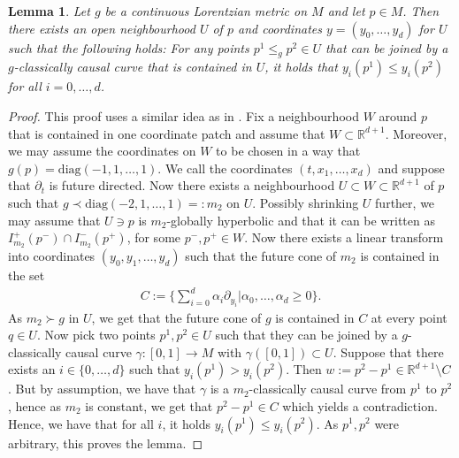 \documentclass[a4paper,10pt]{article}
\newtheorem{lemma}[theorem]{Lemma}
\numberwithin{equation}{section}
\newcommand{\R}{\mathbb{R}}
\newcommand{\diag}{\mathrm{diag}}
\begin{document}
\begin{lemma}\label{coordinates_causal_curves_monotone}
    Let $g$ be a continuous Lorentzian metric on $M$ and let $p \in M$. Then there exists an open neighbourhood $U$ of $p$ and coordinates $y= (y_0, \ldots, y_d)$ for $U$ such that the following holds: For any points $p^1 \leq_g p^2 \in U$ that can be joined by a $g$-classically causal curve that is contained in $U$, it holds that $y_i(p^1) \leq y_i(p^2)$ for all $i =0, \ldots, d$.
\end{lemma}
\begin{proof}
    This proof uses a similar idea as in \cite[Theorem A.1]{beran2024nonlinear}. Fix a neighbourhood $W$ around $p$ that is contained in one coordinate patch and assume that $W \subset \R^{d+1}$. Moreover, we may assume the coordinates on $W$ to be chosen in a way that $g(p) = \diag(-1, 1, \ldots, 1)$. 
    We call the coordinates $(t, x_1, \ldots, x_d)$ and suppose that $\partial_t$ is future directed. 
    Now there exists a neighbourhood $U \subset W \subset \R^{d+1}$ of $p$ such that $g \prec \mathrm{diag}(-2, 1, \ldots, 1)=: m_2$ on $U$. Possibly shrinking $U$ further, we may assume that $U \ni p$ is $m_2$-globally hyperbolic and that it can be written as $I_{m_2}^+(p^-) \cap I_{m_2}^-(p^+)$, for some $p^-, p^+ \in W$. 
    Now there exists a linear transform into coordinates $(y_0, y_1, \ldots, y_d)$ such that the future cone of $m_2$ is contained in the set 
    \begin{align*}
        C:=\big\{\sum_{i=0}^d \alpha_i \partial_{y_i}| \alpha_0, \ldots, \alpha_d \geq 0\big\}.
    \end{align*}
    As $m_2 \succ g$ in $U$, we get that the future cone of $g$ is contained in $C$ at every point $q \in U$. 
    Now pick two points $p^1, p^2 \in U$ such that they can be joined by a $g$-classically causal curve $\gamma\colon [0,1] \to M$ with $\gamma([0,1]) \subset U$.  
    Suppose that there exists an $i \in \{0, \ldots, d\}$ such that $y_i(p^1) > y_i(p^2)$. 
    Then $w:=p^2-p^1 \in \R^{d+1} \setminus C$.
    But by assumption, we have that $\gamma$ is a $m_2$-classically causal curve from $p^1$ to $p^2$, hence as $m_2$ is constant, we get that $p^2-p^1 \in C$ which yields a contradiction. Hence, we have that for all $i$, it holds $y_i(p^1) \leq y_i(p^2)$. As $p^1, p^2$ were arbitrary, this proves the lemma. 
\end{proof}

\smallskip
\end{document}
